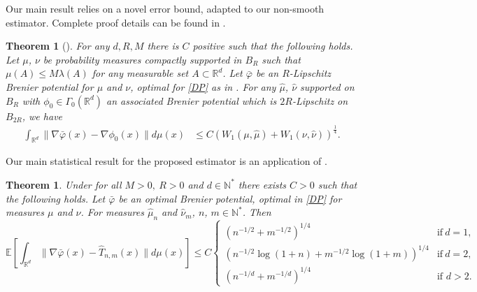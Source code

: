 \documentclass[11pt]{article}
\newtheorem{theorem}[lemma]{Theorem}
\newcommand{\R}{\mathbb R}
\newcommand{\RR}{\mathbb{R}}
\newcommand{\1}{\mathbbm{1}}
\numberwithin{equation}{section}
\begin{document}
Our main result relies on a novel error bound, adapted to our non-smooth estimator. Complete proof details  can be found in .

\begin{theorem}[]
For any $d,R,M$ there is $C$ positive such that the following holds. Let $\mu$, $\nu$ be probability measures compactly supported in $B_R$ such that $\mu(A) \leq M \lambda(A)$ for any measurable set $A \subset \RR^d$. Let $\bar{\varphi}$ be an $R$-Lipschitz Brenier potential for $\mu$ and $\nu$, optimal for \eqref{DP} as in .  For any $\hat{\mu}$, $\hat{\nu}$ supported on $B_R$ with $\phi_0 \in \Gamma_0(\R^d)$ an associated  Brenier potential which is $2R$-Lipschitz on $B_{2R}$, we have
    \begin{align*}
       \int_{\R^d} \| \nabla \bar{\varphi}(x) - \nabla \phi_0(x)\| d\mu(x) &\leq C\left(W_1(\mu,\hat{\mu}) + W_1 (\nu, \hat{\nu})\right)^{\frac{1}{4}}. 
    \end{align*}    
    \label{th:simplerForm2}
\end{theorem}

Our main statistical result for the proposed estimator is an application of . 
\begin{theorem}
    Under  for all $M>0,\:R>0$ and $d\in \mathbb{N}^*$ there exists $C>0$ such that the following holds. Let  $\bar{\varphi}$ be an optimal Brenier potential, optimal in \eqref{DP} for measures $\mu$ and $\nu$. For measures $\hat{\mu}_n$ and $\hat{\nu}_m$, $n$, $m\in \mathbb{N}^*$. Then 
    \begin{equation*}
        \mathbb{E}\left[\int_{\R^d}\|\nabla \bar{\varphi}(x)-\hat{T}_{n,m}(x)\|d\mu(x)\right]\leq C
        \begin{cases}
            \left( n^{-1/2}+m^{-1/2}\right)^{1/4} & \text{if}\: d=1 ,\\
            \left(n^{-1/2}\log(1+n)+m^{-1/2}\log(1+m)\right)^{1/4} & \text{if}\: d=2,\\
            \left( n^{-1/d} +m^{-1/d}\right)^{1/4} & \text{if } d > 2.
        \end{cases}
    \end{equation*}
    \label{th:main_stat_result}
\end{theorem}
\end{document}
